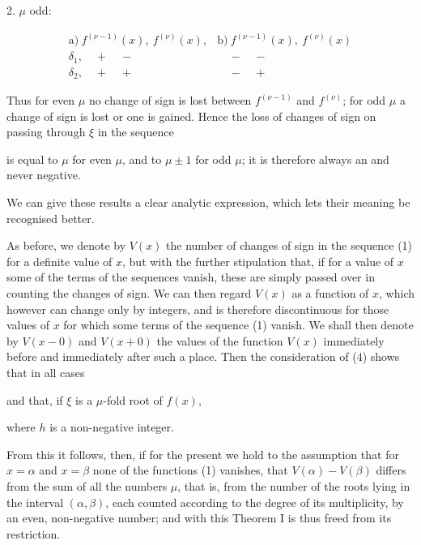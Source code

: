 
2. $\mu$ odd:

\[
\begin{array}{ll}
\text{a)}\ f^{(\nu-1)}(x),\ f^{(\nu)}(x), & \text{b)}\ f^{(\nu-1)}(x),\ f^{(\nu)}(x) \\[2pt]
\delta_1,\quad + \quad - & \quad - \quad - \\[2pt]
\delta_2,\quad + \quad + & \quad - \quad +
\end{array}
\]

Thus for even $\mu$ no change of sign is lost between $f^{(\nu-1)}$ and $f^{(\nu)}$; for odd $\mu$ a change of sign is lost or one is gained. Hence the loss of changes of sign on passing through $\xi$ in the sequence


is equal to $\mu$ for even $\mu$, and to $\mu \pm 1$ for odd $\mu$; it is therefore always an  and never negative.

We can give these results a clear analytic expression, which lets their meaning be recognised better.

As before, we denote by $V(x)$ the number of changes of sign in the sequence (1) for a definite value of $x$, but with the further stipulation that, if for a value of $x$ some of the terms of the sequences vanish, these are simply passed over in counting the changes of sign. We can then regard $V(x)$ as a function of $x$, which however can change only by integers, and is therefore discontinuous for those values of $x$ for which some terms of the sequence (1) vanish. We shall then denote by $V(x-0)$ and $V(x+0)$ the values of the function $V(x)$ immediately before and immediately after such a place. Then the consideration of (4) shows that in all cases


and that, if $\xi$ is a $\mu$-fold root of $f(x)$,


where $h$ is a non-negative integer.

From this it follows, then, if for the present we hold to the assumption that for $x = \alpha$ and $x = \beta$ none of the functions (1) vanishes, that $V(\alpha) - V(\beta)$ differs from the sum of all the numbers $\mu$, that is, from the number of the roots lying in the interval $(\alpha, \beta)$, each counted according to the degree of its multiplicity, by an even, non-negative number; and with this Theorem I is thus freed from its restriction.
